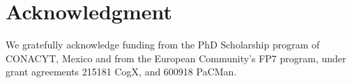 \documentclass[journal]{IEEEtran}
\begin{document}

%





\section*{Acknowledgment}

We gratefully acknowledge funding from the PhD Scholarship program of CONACYT, Mexico and from the European Community's FP7 program, under grant agreements 215181 CogX, and 600918 PaCMan.


\ifCLASSOPTIONcaptionsoff
  \newpage
\fi



\end{document}
